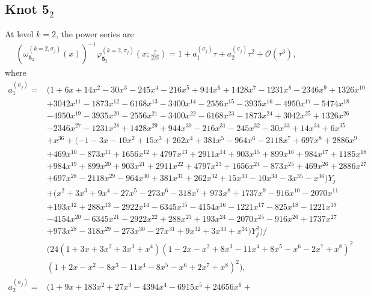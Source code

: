 \documentclass[a4paper,11pt]{article}	%
\def\md{\mathbf}
\def\cO{\mathcal{O}}
\newcommand{\ri}{{\mathsf{i}}}
\newcommand{\nn}{\nonumber \\}
\newcommand{\s}{\sigma}
\newcommand{\knot}[1]{\md{#1}}
\begin{document}
\subsection{Knot $\knot{5}_2$}
\label{sc:phi.52}

At level $k=2$, the power series are
\begin{align}
  (\omega_{\knot{5}_2}^{(k=2,\s_j)}(x))^{-1}
  \varphi_{\knot{5}_2}^{(k=2,\s_j)}(x;\frac{\tau}{2\pi\ri}) = 1
  + a_1^{(\s_j)}\tau + a_2^{(\s_j)}\tau^2 + \cO(\tau^3),
\end{align}
where
\begin{subequations}
  \begin{align}
    a_1^{(\s_j)} =
    &(1 + 6 x + 14 x^2 - 30 x^3 - 245 x^4 - 216 x^5 + 944 x^6 + 1428 x^7 - 
      1231 x^8 - 2346 x^9 + 1326 x^{10}\nn
    &+ 3042 x^{11} - 1873 x^{12} - 
      6168 x^{13} - 3400 x^{14} - 2556 x^{15} - 3935 x^{16} - 4950 x^{17} - 
      5474 x^{18}\nn
    &- 4950 x^{19} - 3935 x^{20} - 2556 x^{21} - 3400 x^{22} - 
      6168 x^{23} - 1873 x^{24} + 3042 x^{25} + 1326 x^{26}\nn
    &- 2346 x^{27} - 
      1231 x^{28} + 1428 x^{29} + 944 x^{30} - 216 x^{31} - 245 x^{32} - 30 x^{33} + 
      14 x^{34} + 6 x^{35} \nn
    &+ x^{36} + (-1 - 3 x  - 10 x^2 + 15 x^3 +
      262 x^4 + 381 x^5  - 964 x^6  - 2118 x^7  + 697 x^8  + 
      2886 x^9 \nn
    &+ 469 x^{10} - 873 x^{11} + 1656 x^{12} + 4797 x^{13} + 
      2911 x^{14} + 903 x^{15} + 899 x^{16} + 984 x^{17} + 1185
      x^{18}\nn
    &+ 984 x^{19} + 899 x^{20} + 903 x^{21} + 2911 x^{22} + 4797 x^{23} + 
      1656 x^{24} - 873 x^{25} + 469 x^{26} + 2886 x^{27} \nn
    &+ 697 x^{28} - 2118 x^{29} - 964 x^{30} + 381 x^{31} + 262 x^{32} + 15 x^{33} - 
      10 x^{34} - 3 x^{35} - x^{36}) Y_j\nn
    &+ (x^2 + 3 x^3 + 9 x^4 - 
      27 x^5 - 273 x^6 - 318 x^7 + 973 x^8 + 
      1737 x^9 - 916 x^{10} - 2070 x^{11}\nn
    &+ 193 x^{12} + 
      288 x^{13} - 2922 x^{14} - 6345 x^{15} - 4154 x^{16} - 
      1221 x^{17} - 825 x^{18} - 1221 x^{19}\nn
    &- 4154 x^{20} - 
      6345 x^{21} - 2922 x^{22} + 288 x^{23} + 193 x^{24} - 
      2070 x^{25} - 916 x^{26} + 1737 x^{27}\nn
    &+ 973 x^{28} - 
      318 x^{29} - 273 x^{30} - 27 x^{31} + 9 x^{32} + 
      3 x^{33} + 
      x^{34}) Y_j^2)/\nn
    &(24 (1 + 3 x + 3 x^2 + 3 x^3 + x^4) (1 - 2 x - x^2 + 
      8 x^3 - 11 x^4 + 8 x^5 - x^6 - 2 x^7 + x^8)^2 \nn
    &(1 + 2 x - x^2 - 
      8 x^3 - 11 x^4 - 8 x^5 - x^6 + 2 x^7 + x^8)^2),\\
    a_2^{(\s_j)} =
    &(1 + 9 x + 183 x^2 + 27 x^3 - 4394 x^4 - 6915 x^5 + 24656 x^6 + 

\end{align}
\end{subequations}
\end{document}
